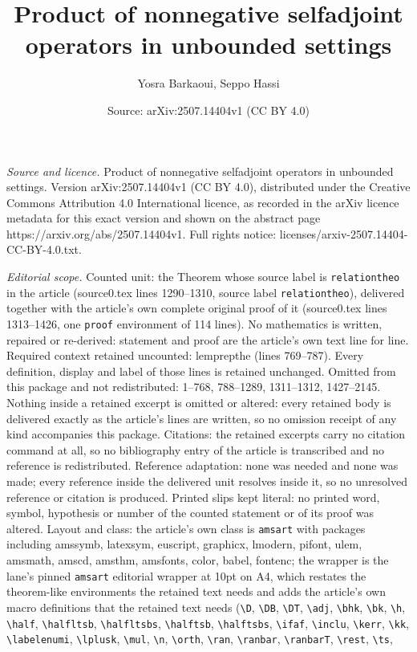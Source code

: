 \documentclass[10pt,a4paper]{amsart}
\title[Product of nonnegative selfadjoint operators in unbounded se]{Product of nonnegative selfadjoint operators in unbounded settings}
\author{Yosra Barkaoui, Seppo Hassi}
\date{Source: arXiv:2507.14404v1 (CC BY 4.0)}
\begin{document}
\maketitle

\noindent\emph{Source and licence.} Product of nonnegative selfadjoint operators in unbounded settings. Version arXiv:2507.14404v1 (CC BY 4.0), distributed under the Creative Commons Attribution 4.0 International licence, as recorded in the arXiv licence metadata for this exact version and shown on the abstract page https://arxiv.org/abs/2507.14404v1. Full rights notice: licenses/arxiv-2507.14404-CC-BY-4.0.txt.\par\smallskip

\noindent\textit{Editorial scope.} Counted unit: the Theorem whose source label is \texttt{relationtheo} in the article (source0.tex lines 1290--1310, source label \texttt{relationtheo}), delivered together with the article's own complete original proof of it (source0.tex lines 1313--1426, one \texttt{proof} environment of 114 lines). No mathematics is written, repaired or re-derived: statement and proof are the article's own text line for line. Required context retained uncounted: lemprepthe (lines 769--787). Every definition, display and label of those lines is retained unchanged. Omitted from this package and not redistributed: 1--768, 788--1289, 1311--1312, 1427--2145. Nothing inside a retained excerpt is omitted or altered: every retained body is delivered exactly as the article's lines are written, so no omission receipt of any kind accompanies this package. Citations: the retained excerpts carry no citation command at all, so no bibliography entry of the article is transcribed and no reference is redistributed. Reference adaptation: none was needed and none was made; every reference inside the delivered unit resolves inside it, so no unresolved reference or citation is produced. Printed slips kept literal: no printed word, symbol, hypothesis or number of the counted statement or of its proof was altered. Layout and class: the article's own class is \texttt{amsart} with packages including amssymb, latexsym, euscript, graphicx, lmodern, pifont, ulem, amsmath, amscd, amsthm, amsfonts, color, babel, fontenc; the wrapper is the lane's pinned \texttt{amsart} editorial wrapper at 10pt on A4, which restates the theorem-like environments the retained text needs and adds the article's own macro definitions that the retained text needs (\texttt{\textbackslash D}, \texttt{\textbackslash DB}, \texttt{\textbackslash DT}, \texttt{\textbackslash adj}, \texttt{\textbackslash bhk}, \texttt{\textbackslash bk}, \texttt{\textbackslash h}, \texttt{\textbackslash half}, \texttt{\textbackslash halfltsb}, \texttt{\textbackslash halfltsbs}, \texttt{\textbackslash halftsb}, \texttt{\textbackslash halftsbs}, \texttt{\textbackslash ifaf}, \texttt{\textbackslash inclu}, \texttt{\textbackslash kerr}, \texttt{\textbackslash kk}, \texttt{\textbackslash labelenumi}, \texttt{\textbackslash lplusk}, \texttt{\textbackslash mul}, \texttt{\textbackslash n}, \texttt{\textbackslash orth}, \texttt{\textbackslash ran}, \texttt{\textbackslash ranbar}, \texttt{\textbackslash ranbarT}, \texttt{\textbackslash rest}, \texttt{\textbackslash ts}, 
\end{document}
